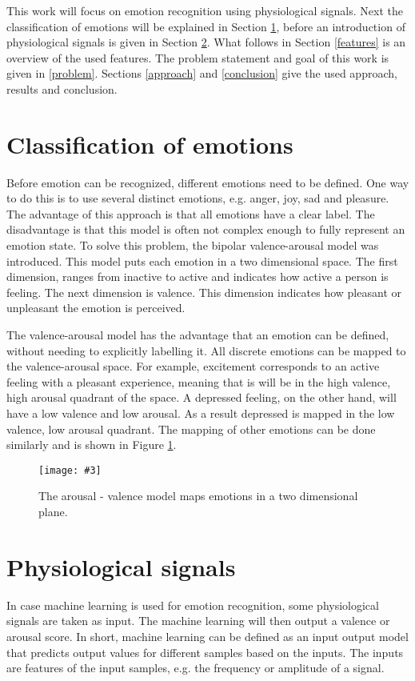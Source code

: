 \documentclass[12pt,journal,compsoc]{IEEEtran}
\newcommand{\npar}{\par \vspace{2.3ex plus 0.3ex minus 0.3ex}}
\newcommand{\mijnfiguur}[4][H]{            %
    \begin{figure}[#1]                      %
        \begin{center}                      %
            \texttt{[image: \#3]}        %
            \caption{#4\label{#3}}          %
        \end{center}
    \end{figure}
    }
\begin{document}
\npar

This work will focus on emotion recognition using physiological signals. Next the classification of emotions will be explained in Section \ref{classification}, before an introduction of physiological signals is given in Section \ref{phyintro}. What follows in Section \ref{features} is an overview of the used features. The problem statement and goal of this work is given in \ref{problem}. Sections \ref{approach} and \ref{conclusion} give the used approach, results and conclusion.

\section{Classification of emotions}\label{classification}
Before emotion can be recognized, different emotions need to be defined. One way to do this is to use several distinct emotions, e.g. anger, joy, sad and pleasure. The advantage of this approach is that all emotions have a clear label. The disadvantage is that this model is often not complex enough to fully represent an emotion state. To solve this problem, the bipolar valence-arousal model was introduced. This model puts each emotion in a two dimensional space. The first dimension, ranges from inactive to active and indicates how active a person is feeling. The next dimension is valence. This dimension indicates how pleasant or unpleasant the emotion is perceived. 

\npar

The valence-arousal model has the advantage that an emotion can be defined, without needing to explicitly labelling it. All discrete emotions can be mapped to the valence-arousal space. For example, excitement corresponds to an active feeling with a pleasant experience, meaning that is will be in the high valence, high arousal quadrant of the space. A depressed feeling, on the other hand, will have a low valence and low arousal. As a result depressed is mapped in the low valence, low arousal quadrant. The mapping of other emotions can be done similarly and is shown in Figure \ref{ArousalValenceModel}.

\mijnfiguur{width=0.5\textwidth}{ArousalValenceModel}{The arousal - valence model maps emotions in a two dimensional plane.}

\section{Physiological signals} \label{phyintro}
In case machine learning is used for emotion recognition, some physiological signals are taken as input. The machine learning will then output a valence or arousal score. In short, machine learning can be defined as an input output model that predicts output values for different samples based on the inputs. The inputs are features of the input samples, e.g. the frequency or amplitude of a signal.
\end{document}
